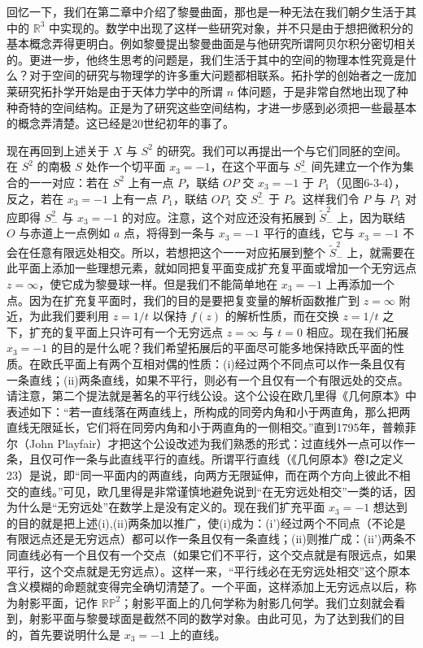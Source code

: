 回忆一下，我们在第二章中介绍了黎曼曲面，那也是一种无法在我们朝夕生活于其中的 $\mathbb R^3$ 中实现的。数学中出现了这样一些研究对象，并不只是由于想把微积分的基本概念弄得更明白。例如黎曼提出黎曼曲面是与他研究所谓阿贝尔积分密切相关的。更进一步，他终生思考的问题是，我们生活于其中的空间的物理本性究竟是什么？对于空间的研究与物理学的许多重大问题都相联系。拓扑学的创始者之一庞加莱研究拓扑学开始是由于天体力学中的所谓 $n$ 体问题，于是非常自然地出现了种种奇特的空间结构。正是为了研究这些空间结构，才进一步感到必须把一些最基本的概念弄清楚。这已经是20世纪初年的事了。

现在再回到上述关于 $X$ 与 $S^2$ 的研究。我们可以再提出一个与它们同胚的空间。在 $S^2$ 的南极 $S$ 处作一个切平面 $x_3=-1$，在这个平面与 $S_-^2$ 间先建立一个作为集合的一一对应：若在 $S^2$ 上有一点 $P$，联结 $OP$ 交 $x_3=-1$ 于 $P_1$（见图6-3-4），反之，若在 $x_3=-1$ 上有一点 $P_1$，联结 $OP_1$ 交 $S_-^2$ 于 $P$。这样我们令 $P$ 与 $P_1$ 对应即得 $S_-^2$ 与 $x_3=-1$ 的对应。注意，这个对应还没有拓展到 $\widetilde S_-^2$ 上，因为联结 $O$ 与赤道上一点例如 $a$ 点，将得到一条与 $x_3=-1$ 平行的直线，它与 $x_3=-1$ 不会在任意有限远处相交。所以，若想把这个一一对应拓展到整个 $\widetilde S_-^2$ 上，就需要在此平面上添加一些理想元素，就如同把复平面变成扩充复平面或增加一个无穷远点 $z=\infty$，使它成为黎曼球一样。但是我们不能简单地在 $x_3=-1$ 上再添加一个点。因为在扩充复平面时，我们的目的是要把复变量的解析函数推广到 $z=\infty$ 附近，为此我们要利用 $z=1/t$ 以保持 $f(z)$ 的解析性质，而在交换 $z=1/t$ 之下，扩充的复平面上只许可有一个无穷远点 $z=\infty$ 与 $t=0$ 相应。现在我们拓展 $x_3=-1$ 的目的是什么呢？我们希望拓展后的平面尽可能多地保持欧氏平面的性质。在欧氏平面上有两个互相对偶的性质：(i)经过两个不同点可以作一条且仅有一条直线；(ii)两条直线，如果不平行，则必有一个且仅有一个有限远处的交点。请注意，第二个提法就是著名的平行线公设。这个公设在欧几里得《几何原本》中表述如下：“若一直线落在两直线上，所构成的同旁内角和小于两直角，那么把两直线无限延长，它们将在同旁内角和小于两直角的一侧相交。”直到1795年，普赖菲尔（John Playfair）才把这个公设改述为我们熟悉的形式：过直线外一点可以作一条，且仅可作一条与此直线平行的直线。所谓平行直线（《几何原本》卷I之定义23）是说，即“同一平面内的两直线，向两方无限延伸，而在两个方向上彼此不相交的直线。”可见，欧几里得是非常谨慎地避免说到“在无穷远处相交”一类的话，因为什么是“无穷远处”在数学上是没有定义的。现在我们扩充平面 $x_3=-1$ 想达到的目的就是把上述(i),(ii)两条加以推广，使(i)成为：(i')经过两个不同点（不论是有限远点还是无穷远点）都可以作一条且仅有一条直线；(ii)则推广成：(ii')两条不同直线必有一个且仅有一个交点（如果它们不平行，这个交点就是有限远点，如果平行，这个交点就是无穷远点）。这样一来，“平行线必在无穷远处相交”这个原本含义模糊的命题就变得完全确切清楚了。一个平面，这样添加上无穷远点以后，称为射影平面，记作 $\mathbb{RP}^2$；射影平面上的几何学称为射影几何学。我们立刻就会看到，射影平面与黎曼球面是截然不同的数学对象。由此可见，为了达到我们的目的，首先要说明什么是 $x_3=-1$ 上的直线。

